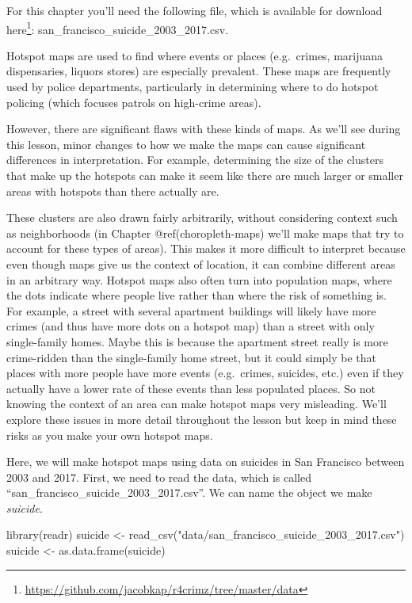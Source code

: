 \documentclass[
  a4paper,
]{krantz}
\makeatletter
\newenvironment{Shaded}{\begin{snugshade}}{\end{snugshade}}
\newcommand{\FunctionTok}[1]{\textcolor[rgb]{0.00,0.00,0.00}{#1}}
\newcommand{\NormalTok}[1]{#1}
\newcommand{\OtherTok}[1]{\textcolor[rgb]{0.56,0.35,0.01}{#1}}
\newcommand{\StringTok}[1]{\textcolor[rgb]{0.31,0.60,0.02}{#1}}
\renewcommand{\href}[2]{#2\footnote{\url{#1}}}
\newenvironment{kframe}{%
\medskip{}
\setlength{\fboxsep}{.8em}
 \def\at@end@of@kframe{}%
 \ifinner\ifhmode%
  \def\at@end@of@kframe{\end{minipage}}%
  \begin{minipage}{\columnwidth}%
 \fi\fi%
 \def\FrameCommand##1{\hskip\@totalleftmargin \hskip-\fboxsep
 \colorbox{shadecolor}{##1}\hskip-\fboxsep
     \hskip-\linewidth \hskip-\@totalleftmargin \hskip\columnwidth}%
 \MakeFramed {\advance\hsize-\width
   \@totalleftmargin\z@ \linewidth\hsize
   \@setminipage}}%
 {\par\unskip\endMakeFramed%
 \at@end@of@kframe}
\renewenvironment{Shaded}{\begin{kframe}}{\end{kframe}}
\makeatother
\begin{document}
For this chapter you'll need the following file, which is
available for download
\href{https://github.com/jacobkap/r4crimz/tree/master/data}{here}:
san\_francisco\_suicide\_2003\_2017.csv.

Hotspot maps are used to find where events or places
(e.g.~crimes, marijuana dispensaries, liquors stores) are
especially prevalent. These maps are frequently used by
police departments, particularly in determining where to do
hotspot policing (which focuses patrols on high-crime
areas).

However, there are significant flaws with these kinds of
maps. As we'll see during this lesson, minor changes to how
we make the maps can cause significant differences in
interpretation. For example, determining the size of the
clusters that make up the hotspots can make it seem like
there are much larger or smaller areas with hotspots than
there actually are.

These clusters are also drawn fairly arbitrarily, without
considering context such as neighborhoods (in Chapter
@ref(choropleth-maps) we'll make maps that try to account
for these types of areas). This makes it more difficult to
interpret because even though maps give us the context of
location, it can combine different areas in an arbitrary
way. Hotspot maps also often turn into population maps,
where the dots indicate where people live rather than where
the risk of something is. For example, a street with several
apartment buildings will likely have more crimes (and thus
have more dots on a hotspot map) than a street with only
single-family homes. Maybe this is because the apartment
street really is more crime-ridden than the single-family
home street, but it could simply be that places with more
people have more events (e.g.~crimes, suicides, etc.) even
if they actually have a lower rate of these events than less
populated places. So not knowing the context of an area can
make hotspot maps very misleading. We'll explore these
issues in more detail throughout the lesson but keep in mind
these risks as you make your own hotspot maps.

Here, we will make hotspot maps using data on suicides in
San Francisco between 2003 and 2017. First, we need to read
the data, which is called
``san\_francisco\_suicide\_2003\_2017.csv''. We can name the
object we make \emph{suicide}.

\begin{Shaded}
\begin{Highlighting}[]
\FunctionTok{library}\NormalTok{(readr)}
\NormalTok{suicide }\OtherTok{\textless{}{-}} \FunctionTok{read\_csv}\NormalTok{(}\StringTok{"data/san\_francisco\_suicide\_2003\_2017.csv"}\NormalTok{)}
\NormalTok{suicide }\OtherTok{\textless{}{-}} \FunctionTok{as.data.frame}\NormalTok{(suicide)}
\end{Highlighting}
\end{Shaded}
\end{document}
